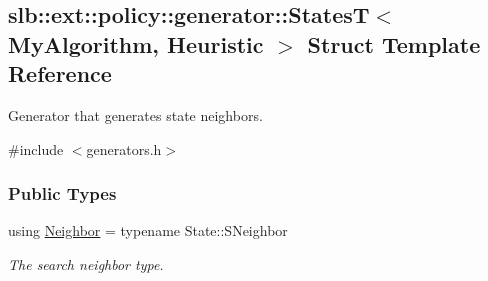 \hypertarget{structslb_1_1ext_1_1policy_1_1generator_1_1StatesT}{}\subsection{slb\+:\+:ext\+:\+:policy\+:\+:generator\+:\+:StatesT$<$ My\+Algorithm, Heuristic $>$ Struct Template Reference}
\label{structslb_1_1ext_1_1policy_1_1generator_1_1StatesT}


Generator that generates state neighbors.  




{\ttfamily \#include $<$generators.\+h$>$}

\subsubsection*{Public Types}
\begin{DoxyCompactItemize}
\item 
using \hyperlink{structslb_1_1ext_1_1policy_1_1generator_1_1StatesT_aabbc05d367ac5da87108f453240e6a32}{Neighbor} = typename State\+::\+S\+Neighbor\hypertarget{structslb_1_1ext_1_1policy_1_1generator_1_1StatesT_aabbc05d367ac5da87108f453240e6a32}{}\label{structslb_1_1ext_1_1policy_1_1generator_1_1StatesT_aabbc05d367ac5da87108f453240e6a32}

\begin{DoxyCompactList}\small\item\em The search neighbor type. \end{DoxyCompactList}\end{DoxyCompactItemize}
